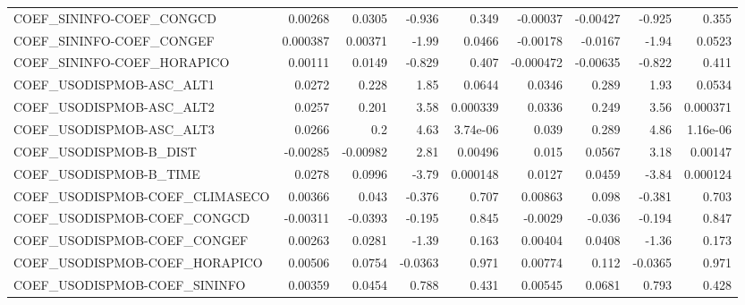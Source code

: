 \begin{tabular}{lrrrrrrrr}
COEF\_SININFO-COEF\_CONGCD       &     0.00268 &       0.0305 &  -0.936 &    0.349 &   -0.00037 &    -0.00427 &       -0.925 &         0.355 \\
COEF\_SININFO-COEF\_CONGEF       &    0.000387 &      0.00371 &   -1.99 &   0.0466 &   -0.00178 &     -0.0167 &        -1.94 &        0.0523 \\
COEF\_SININFO-COEF\_HORAPICO     &     0.00111 &       0.0149 &  -0.829 &    0.407 &  -0.000472 &    -0.00635 &       -0.822 &         0.411 \\
COEF\_USODISPMOB-ASC\_ALT1       &      0.0272 &        0.228 &    1.85 &   0.0644 &     0.0346 &       0.289 &         1.93 &        0.0534 \\
COEF\_USODISPMOB-ASC\_ALT2       &      0.0257 &        0.201 &    3.58 & 0.000339 &     0.0336 &       0.249 &         3.56 &      0.000371 \\
COEF\_USODISPMOB-ASC\_ALT3       &      0.0266 &          0.2 &    4.63 & 3.74e-06 &      0.039 &       0.289 &         4.86 &      1.16e-06 \\
COEF\_USODISPMOB-B\_DIST         &    -0.00285 &     -0.00982 &    2.81 &  0.00496 &      0.015 &      0.0567 &         3.18 &       0.00147 \\
COEF\_USODISPMOB-B\_TIME         &      0.0278 &       0.0996 &   -3.79 & 0.000148 &     0.0127 &      0.0459 &        -3.84 &      0.000124 \\
COEF\_USODISPMOB-COEF\_CLIMASECO &     0.00366 &        0.043 &  -0.376 &    0.707 &    0.00863 &       0.098 &       -0.381 &         0.703 \\
COEF\_USODISPMOB-COEF\_CONGCD    &    -0.00311 &      -0.0393 &  -0.195 &    0.845 &    -0.0029 &      -0.036 &       -0.194 &         0.847 \\
COEF\_USODISPMOB-COEF\_CONGEF    &     0.00263 &       0.0281 &   -1.39 &    0.163 &    0.00404 &      0.0408 &        -1.36 &         0.173 \\
COEF\_USODISPMOB-COEF\_HORAPICO  &     0.00506 &       0.0754 & -0.0363 &    0.971 &    0.00774 &       0.112 &      -0.0365 &         0.971 \\
COEF\_USODISPMOB-COEF\_SININFO   &     0.00359 &       0.0454 &   0.788 &    0.431 &    0.00545 &      0.0681 &        0.793 &         0.428 \\
\bottomrule
\end{tabular}
